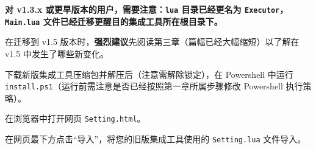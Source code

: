






\textbf{\color{red}对 v1.3.x 或更早版本的用户，需要注意：\lstinline{lua} 目录已经更名为 \lstinline{Executor}，\lstinline{Main.lua} 文件已经迁移更醒目的集成工具所在根目录下。}

在迁移到 v1.5 版本时，\textbf{\color{red}强烈建议}先阅读第三章（篇幅已经大幅缩短）以了解在 v1.5 中发生了哪些新变化。

下载新版集成工具压缩包并解压后（注意需解除锁定），在 Powershell 中运行 \lstinline{install.ps1}（运行前需注意是否已经按照第一章所属步骤修改 Powershell 执行策略）。

在浏览器中打开网页 \lstinline{Setting.html}。

在网页最下方点击“导入”，将您的旧版集成工具使用的 \lstinline{Setting.lua} 文件导入。

